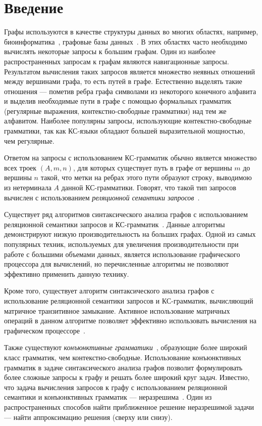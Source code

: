 \documentclass [a4paper] {article}
\begin{document}
	\section{Введение}
	Графы используются в качестве структуры данных во многих областях, например, биоинформатика~\cite{Bio}, графовые базы данных~\cite{graphDB}. В этих областях часто необходимо вычислять некоторые запросы к большим графам. Один из наиболее распространенных запросам к графам являются навигационные запросы. Результатом вычисления таких запросов является множество неявных отношений между вершинами графа, то есть путей в графе. Естественно выделять такие отношения --- пометив ребра графа символами из некоторого конечного алфавита и выделив необходимые пути в графе с помощью формальных грамматик (регулярные выражения, контекстно-свободные грамматики) над тем же алфавитом. Наиболее популярны запросы, использующие контекстно-свободные грамматики, так как КС-языки обладают большей выразительной мощностью, чем регулярные.
	
	Ответом на запросы с использованием КС-грамматик обычно является множество всех троек $(A, m, n)$, для которых существует путь в графе от вершины $m$ до вершины $n$ такой, что метки на ребрах этого пути образуют строку, выводимою из нетерминала $A$ данной КС-грамматики. Говорят, что такой тип запросов вычислен с использованием \textit{реляционной семантики запросов}~\cite{hellingsRelational}. 
	
	Существует ряд алгоритмов синтаксического анализа графов с использованием реляционной семантики запросов и КС-грамматик~\cite{hellingsRelational, RDF, GraphQueryWithEarley}. Данные алгоритмы демонстрируют низкую производительность на больших графах. Одной из самых популярных техник, используемых для увеличения производительности при работе с большими объемами данных, является использование графического процессора для вычислений, но перечисленные алгоритмы не позволяют эффективно применить данную технику.
	
	Кроме того, существует алгоритм синтаксического анализа графов с использование реляционной семантики запросов и КС-грамматик, вычисляющий матричное транзитивное замыкание. Активное использование матричных операций в данном алгоритме позволяет эффективно использовать вычисления на графическом процессоре~\cite{matricesOnGPGPU}. 
	
	Также существуют \textit{конъюнктивные грамматики}~\cite{okhotin2001conjunctive}, образующие более широкий класс грамматик, чем контекстно-свободные. Использование конъюнктивных грамматик в задаче синтаксического анализа графов позволит формулировать более сложные запросы к графу и решать более широкий круг задач. Известно, что задача вычисления запросов к графу с использованием реляционной семантики и конъюнктивных грамматик --- неразрешима~\cite{hellingsRelational}. Один из распространенных способов найти приближенное решение неразрешимой задачи --- найти аппроксимацию решения (сверху или снизу).
	
\end{document}
